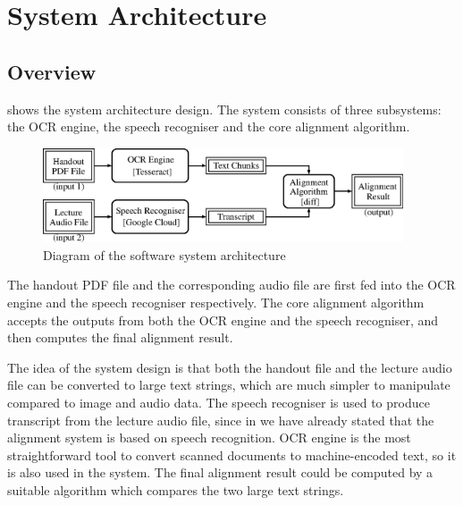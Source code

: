 
\chapter{System Architecture}

\ifpdf
    \graphicspath{{Chapter3/Figs/Raster/}{Chapter3/Figs/PDF/}{Chapter3/Figs/}}
\else
    \graphicspath{{Chapter3/Figs/Vector/}{Chapter3/Figs/}}
\fi


\section{Overview}

 shows the system architecture design. The system consists of three subsystems: the OCR engine, the speech recogniser and the core alignment algorithm.

\begin{figure}[!ht]
  \centering
  \includegraphics[width=0.95\textwidth]{sys-diagram-full.eps}
  \caption{Diagram of the software system architecture}
  \label{fig:sys-diagram-full}
\end{figure}

The handout PDF file and the corresponding audio file are first fed into the OCR engine and the speech recogniser respectively. The core alignment algorithm accepts the outputs from both the OCR engine and the speech recogniser, and then computes the final alignment result.

The idea of the system design is that both the handout file and the lecture audio file can be converted to large text strings, which are much simpler to manipulate compared to image and audio data. The speech recogniser is used to produce transcript from the lecture audio file, since in  we have already stated that the alignment system is based on speech recognition. OCR engine is the most straightforward tool to convert scanned documents to machine-encoded text, so it is also used in the system. The final alignment result could be computed by a suitable algorithm which compares the two large text strings.

